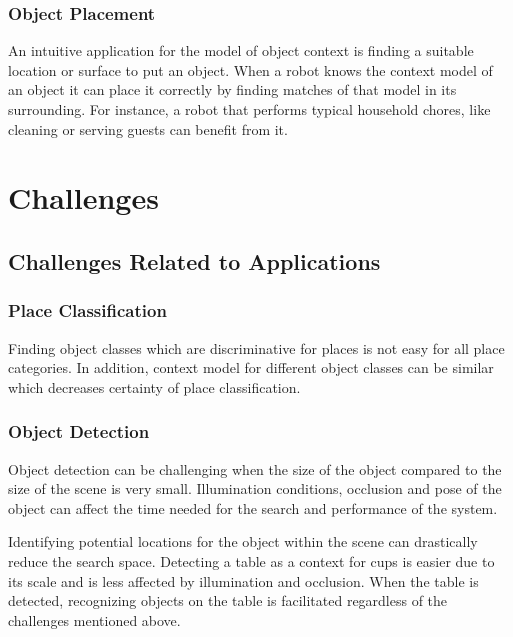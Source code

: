 
 
 \subsubsection*{Object Placement} 
 
 An intuitive application for the model of object context is finding a suitable location or surface to put an object.
 When a robot knows the context model of an object it can place it correctly by finding matches of that model in its 
 surrounding.
 For instance, a robot that performs typical household chores, like cleaning or serving guests can benefit from it.  
 
\section{Challenges}
\label{Challenges.sec}

\subsection{Challenges Related to Applications }%
\label{ChallengesRelatedtoApplications.ssec}

\subsubsection{Place Classification}
\label{placeclassification.ssec}
Finding object classes which are discriminative for places is not easy for all place categories. In addition, context model
for different object classes can be similar which decreases certainty of place classification.  

\subsubsection{Object Detection}
\label{objectdetection.ssec}
Object detection can be challenging when the size of the object compared to the size of the scene is very small. 
Illumination conditions, occlusion and pose of the object can affect the time needed for the search and performance of the system. 

Identifying potential locations for the object within the scene can drastically reduce the search space. 
Detecting a table as a context for cups is easier due to its scale and is less affected by illumination and 
occlusion. 
When the table is detected, recognizing objects on the table is facilitated regardless of the challenges mentioned above.

